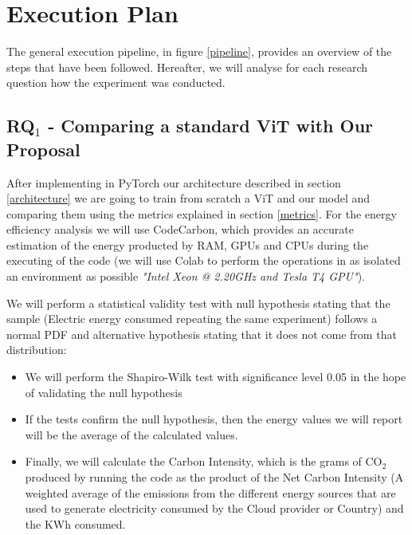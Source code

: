 \section{Execution Plan}
\label{executionplan}

The general execution pipeline, in figure \ref{pipeline}, provides an overview of the steps that have been followed. Hereafter, we will analyse for each research question how the experiment was conducted.
\subsection{\textbf{RQ$_{1}$} - Comparing a standard ViT with Our Proposal} 
After implementing in PyTorch our architecture described in  section \ref{architecture} we are going to train from scratch a ViT and our model and comparing them using the metrics explained in section \ref{metrics}.
For the energy efficiency analysis we will use CodeCarbon, which provides an accurate estimation of the energy producted by RAM, GPUs and CPUs during the executing of the code (we will use Colab to perform the operations in as isolated an environment as possible \textit{"Intel Xeon @ 2.20GHz and Tesla T4 GPU"}). 

We will perform a statistical validity test with null hypothesis stating that the sample (Electric energy consumed repeating the same experiment) follows a normal PDF and alternative hypothesis stating that it does not come from that distribution:
\begin{itemize}
    \item We will perform the Shapiro-Wilk test with significance level 0.05 in the hope of validating the null hypothesis 
    \item If the tests confirm the null hypothesis, then the energy values we will report will be the average of the calculated values.
    \item Finally, we will calculate the Carbon Intensity, which is the grams of CO$_2$ produced by running the code as the product of the Net Carbon Intensity (A weighted average of the emissions from the different energy sources that are used to generate electricity consumed by the Cloud provider or Country) and the KWh consumed.
\end{itemize}

